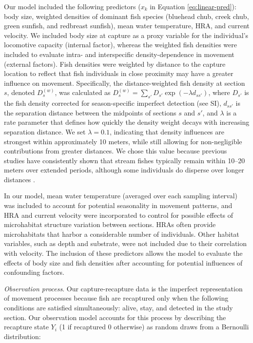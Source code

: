 \documentclass[11pt, class=article, crop=false]{standalone}
\begin{document}
Our model included the following predictors ($x_k$ in Equation \ref{eq:linear-pred}): body size, weighted densities of dominant fish species (bluehead chub, creek chub, green sunfish, and redbreast sunfish), mean water temperature, HRA, and current velocity.
We included body size at capture as a proxy variable for the individual’s locomotive capacity (internal factor), whereas the weighted fish densities were included to evaluate intra- and interspecific density-dependence in movement (external factors).
Fish densities were weighted by distance to the capture location to reflect that fish individuals in close proximity may have a greater influence on movement.
Specifically, the distance-weighted fish density at section $s$, denoted $D^{(w)}_s$, was calculated as $D^{(w)}_s = \sum_{s'} D_{s'}\exp(-\lambda d_{ss'})$, where $D_{s'}$ is the fish density corrected for season-specific imperfect detection (see SI), $d_{ss'}$ is the separation distance between the midpoints of sections $s$ and $s'$, and $\lambda$ is a rate parameter that defines how quickly the density weight decays with increasing separation distance. 
We set $\lambda = 0.1$, indicating that density influences are strongest within approximately 10 meters, while still allowing for non-negligible contributions from greater distances.
We chose this value because previous studies have consistently shown that stream fishes typically remain within 10–20 meters over extended periods, although some individuals do disperse over longer distances \citep{skalskiModelingDiffusiveSpread2000, pepinoFishDispersalFragmented2012, rodriguezRestrictedMovementStream2002, teruiNonrandomDispersalSympatric2021, radingerPatternsPredictorsFish2014}.

In our model, mean water temperature (averaged over each sampling interval) was included to account for potential seasonality in movement patterns, and HRA and current velocity were incorporated to control for possible effects of microhabitat structure variation between sections. HRAs often provide microhabitats that harbor a considerable number of individuals. Other habitat variables, such as depth and substrate, were not included due to their correlation with velocity. The inclusion of these predictors allows the model to evaluate the effects of body size and fish densities after accounting for potential influences of confounding factors.

\textit{Observation process}. Our capture-recapture data is the imperfect representation of movement processes because fish are recaptured only when the following conditions are satisfied simultaneously: alive, stay, and detected in the study section. Our observation model accounts for this process by describing the recapture state $Y_i$ (1 if recaptured 0 otherwise) as random draws from a Bernoulli distribution:
\end{document}
